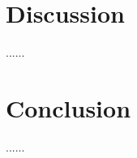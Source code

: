 \documentclass{tufte-book} %
\begin{document}
\chapter{Discussion}
\label{ch:discussion}


......


\chapter{Conclusion}
\label{ch:conclusion}


......


\backmatter




\printindex %
\end{document}
